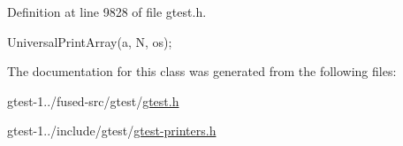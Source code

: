 \-Definition at line 9828 of file gtest.\-h.


\begin{DoxyCode}
                                                     {
    UniversalPrintArray(a, N, os);
  }
\end{DoxyCode}


\-The documentation for this class was generated from the following files\-:\begin{DoxyCompactItemize}
\item 
gtest-\/1../fused-\/src/gtest/\hyperlink{fused-src_2gtest_2gtest_8h}{gtest.\-h}\item 
gtest-\/1../include/gtest/\hyperlink{gtest-printers_8h}{gtest-\/printers.\-h}\end{DoxyCompactItemize}
